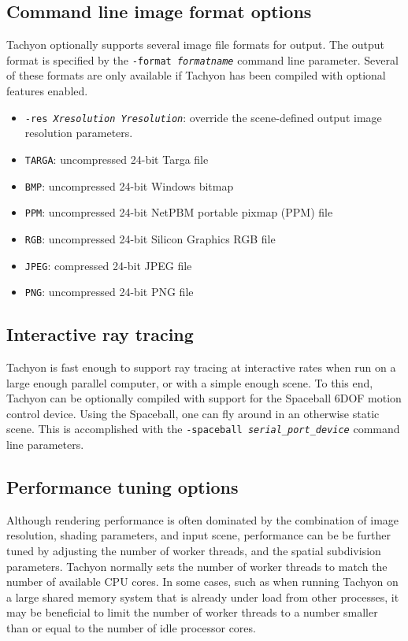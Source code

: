 \subsection{Command line image format options}
Tachyon optionally supports several image file formats for output.
The output format is specified by the {\tt -format {\it formatname}} 
command line parameter.  Several of these formats are only available if
Tachyon has been compiled with optional features enabled.

\begin{itemize}
\item{{\tt -res {\it Xresolution Yresolution}}}: override the 
     scene-defined output image resolution parameters.
\item{{\tt TARGA}}: uncompressed 24-bit Targa file
\item{{\tt BMP}}: uncompressed 24-bit Windows bitmap 
\item{{\tt PPM}}: uncompressed 24-bit NetPBM portable pixmap (PPM) file
\item{{\tt RGB}}: uncompressed 24-bit Silicon Graphics RGB file
\item{{\tt JPEG}}: compressed 24-bit JPEG file
\item{{\tt PNG}}: uncompressed 24-bit PNG file
\end{itemize}


\subsection{Interactive ray tracing}
Tachyon is fast enough to support ray tracing at interactive rates
when run on a large enough parallel computer, or with a simple enough
scene.  To this end, Tachyon can be optionally compiled with support for
the Spaceball 6DOF motion control device.  Using the Spaceball, one
can fly around in an otherwise static scene.  This is accomplished
with the {\tt -spaceball {\it serial\_port\_device}} command line parameters.


\subsection{Performance tuning options}
Although rendering performance is often dominated by 
the combination of image resolution, shading parameters,
and input scene, performance can be be further tuned 
by adjusting the number of worker threads, and 
the spatial subdivision parameters.  Tachyon normally sets
the number of worker threads to match the number of available
CPU cores.  In some cases, such as when running Tachyon on a 
large shared memory system that is already under load from other
processes, it may be beneficial to limit the number of worker threads
to a number smaller than or equal to the number of idle processor cores.

